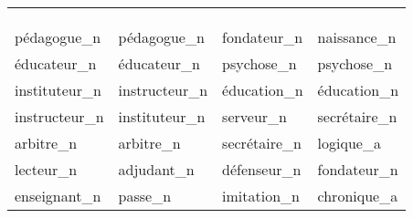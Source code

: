 \begin{table}
    \centering
    \begin{tabularx}{\textwidth}{*{4}{P{.23\textwidth}}}
     \\
     \\
    \toprule
     & &  &  \\
    \toprule
    pédagogue\_n & pédagogue\_n & fondateur\_n & naissance\_n\\
éducateur\_n & éducateur\_n & psychose\_n & psychose\_n\\
instituteur\_n & instructeur\_n & éducation\_n & éducation\_n\\
instructeur\_n & instituteur\_n & serveur\_n & secrétaire\_n\\

arbitre\_n & arbitre\_n & secrétaire\_n & logique\_a\\
lecteur\_n & adjudant\_n & défenseur\_n & fondateur\_n\\
enseignant\_n & passe\_n & imitation\_n & chronique\_a\\


\end{tabularx}
\end{table}
